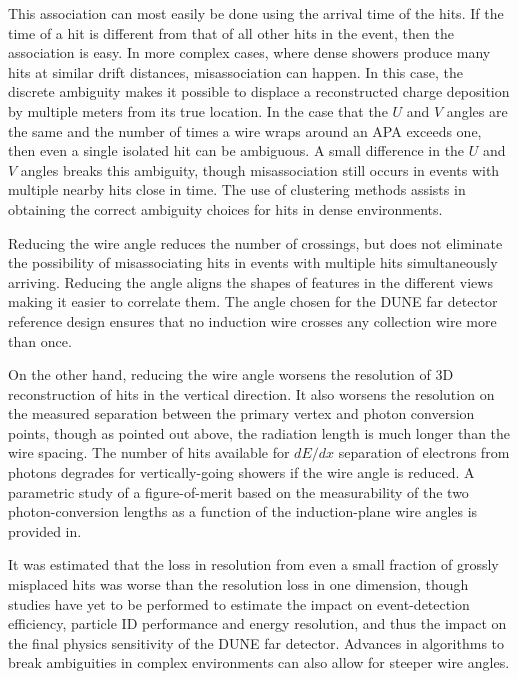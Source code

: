 This association can most easily be done using the arrival time of the
hits.  If the time of a hit is different from that of all other hits
in the event, then the association is easy.  In more complex cases,
where dense showers produce many hits at similar drift distances,
misassociation can happen.  In this case, the discrete ambiguity makes
it possible to displace a reconstructed charge deposition by multiple
meters from its true location.  In the case that the $U$ and $V$
angles are the same and the number of times a wire wraps around an APA
exceeds one, then even a single isolated hit can be ambiguous.  A
small difference in the $U$ and $V$ angles breaks this ambiguity,
though misassociation still occurs in events with multiple nearby hits
close in time.  The use of clustering methods assists in obtaining the
correct ambiguity choices for hits in dense environments.

Reducing the wire angle reduces the number of crossings, but does not
eliminate the possibility of misassociating hits in events with
multiple hits simultaneously arriving.  Reducing the angle aligns the
shapes of features in the different views making it easier to
correlate them.  The angle chosen for the DUNE far detector reference
design ensures that no induction wire crosses any collection wire more
than once.

On the other hand, reducing the wire angle worsens the resolution of
3D reconstruction of hits in the vertical direction. 
It also worsens the resolution on the measured separation between the
primary vertex and photon conversion points, though as pointed out
above, the radiation length is much longer than the wire spacing.  
The number of hits available for $dE/dx$ separation of electrons from
photons degrades for vertically-going showers if the wire angle is
reduced.  A parametric study of a figure-of-merit based on the
measurability of the two photon-conversion lengths as a function of
the induction-plane wire angles is provided
in\cite{wire-orientation}.

It was estimated that the loss in resolution from even a small
fraction of grossly misplaced hits was worse than the resolution loss
in one dimension\cite{docdb-8981}, though studies have yet to be
performed to estimate the impact on event-detection efficiency,
particle ID performance and energy resolution, and thus the impact on
the final physics sensitivity of the DUNE far detector.  Advances in
algorithms to break ambiguities in complex environments can also allow
for steeper wire angles.

